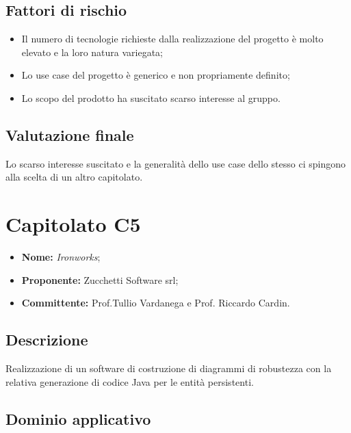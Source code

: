\documentclass[openany,12pt,a4paper]{report}
\begin{document}
	\subsection{Fattori di rischio}

	\begin{itemize}
		\item Il numero di tecnologie richieste dalla realizzazione del progetto è molto elevato e la loro natura variegata;

		\item Lo use case del progetto è generico e non propriamente definito;

		\item Lo scopo del prodotto ha suscitato scarso interesse al gruppo.
	\end{itemize}

	\subsection{Valutazione finale}

	Lo scarso interesse suscitato e la generalità dello use case dello stesso ci spingono alla scelta di un altro capitolato.


	\section{Capitolato C5}

	\begin{itemize}
		\item \textbf{Nome:} \textit{Ironworks};
		\item \textbf{Proponente:} Zucchetti Software srl;
		\item \textbf{Committente:} Prof.Tullio Vardanega e Prof. Riccardo Cardin.
	\end{itemize}

	\subsection{Descrizione}

	Realizzazione di un software di costruzione di diagrammi di robustezza con la relativa generazione di codice Java per le entità persistenti.

	\subsection{Dominio applicativo}
\end{document}
